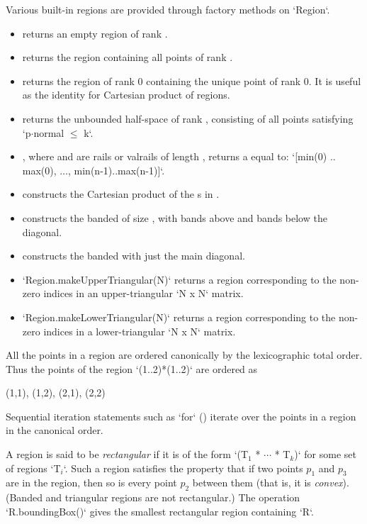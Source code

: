 Various built-in regions are provided through  factory
methods on \xcd`Region`.  
\begin{itemize}
\item {} returns an empty region of rank .
\item {} returns the region containing all points of
      rank .  
\item {} returns the region of rank 0 containing the
      unique point of rank 0.  It is useful as the identity for Cartesian
      product of regions.
\item {} returns the unbounded
      half-space of rank , consisting of all points 
      satisfying \xcdmath`p$\cdot$normal $\le$ k`.
\item {}, where  and 
      are  rails or valrails of length , returns a
       equal to: 
      \xcdmath`[min(0) .. max(0), $\ldots$, min(n-1)..max(n-1)]`.
\item {} constructs the Cartesian product of the
      s in .
\item {} constructs the
      banded  of size , with  bands above
      and  bands below the diagonal.
\item {} constructs the banded  with
      just the main diagonal.
\item \xcd`Region.makeUpperTriangular(N)` returns a region corresponding
to the non-zero indices in an upper-triangular \xcd`N x N` matrix.
\item \xcd`Region.makeLowerTriangular(N)` returns a region corresponding
to the non-zero indices in a lower-triangular \xcd`N x N` matrix.
\end{itemize}

All the points in a region are ordered canonically by the
lexicographic total order. Thus the points of the region \xcd`(1..2)*(1..2)`
are ordered as 
\begin{xten}
(1,1), (1,2), (2,1), (2,2)
\end{xten}
Sequential iteration statements such as \xcd`for` ()
iterate over the points in a region in the canonical order.

A region is said to be {\em rectangular} if it is of
the form \xcdmath`(T$_1$ * $\cdots$ * T$_k$)` for some set of regions
\xcdmath`T$_i$`. Such a
region satisfies the property that if two points $p_1$ and $p_3$ are
in the region, then so is every point $p_2$ between them (that is, it is {\em convex}). 
(Banded and triangular regions are not rectangular.)
The operation
\xcd`R.boundingBox()` gives the smallest rectangular region containing
\xcd`R`.

